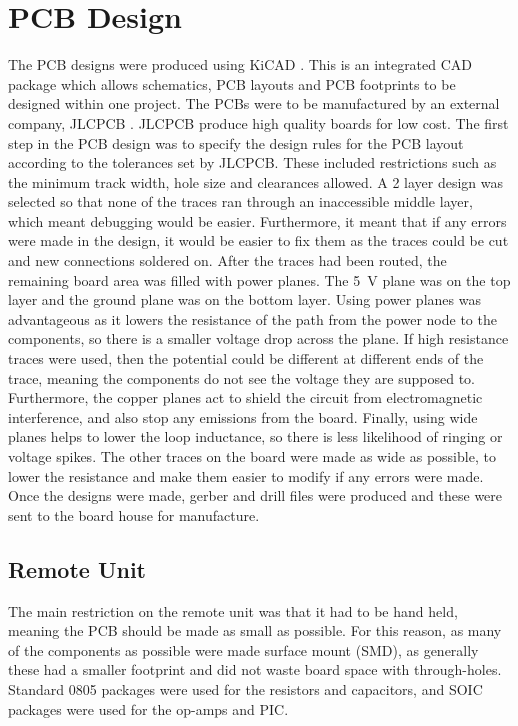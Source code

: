 \section{PCB Design}
The PCB designs were produced using KiCAD \cite{kicad}. This is an integrated CAD package which allows schematics, PCB layouts and PCB footprints to be designed within one project. The PCBs were to be manufactured by an external company, JLCPCB \cite{pcb_house}. JLCPCB produce high quality boards for low cost. The first step in the PCB design was to specify the design rules for the PCB layout according to the tolerances set by JLCPCB. These included restrictions such as the minimum track width, hole size and clearances allowed. A 2 layer design was selected so that none of the traces ran through an inaccessible middle layer, which meant debugging would be easier. Furthermore, it meant that if any errors were made in the design, it would be easier to fix them as the traces could be cut and new connections soldered on. After the traces had been routed, the remaining board area was filled with power planes. The \SI{+5}{\volt} plane was on the top layer and the ground plane was on the bottom layer. Using power planes was advantageous as it lowers the resistance of the path from the power node to the components, so there is a smaller voltage drop across the plane. If high resistance traces were used, then the potential could be different at different ends of the trace, meaning the components do not see the voltage they are supposed to. Furthermore, the copper planes act to shield the circuit from electromagnetic interference, and also stop any emissions from the board. Finally, using wide planes helps to lower the loop inductance, so there is less likelihood of ringing or voltage spikes. The other traces on the board were made as wide as possible, to lower the resistance and make them easier to modify if any errors were made. Once the designs were made, gerber and drill files were produced and these were sent to the board house for manufacture.\\


\subsection{Remote Unit}
The main restriction on the remote unit was that it had to be hand held, meaning the PCB should be made as small as possible. For this reason, as many of the components as possible were made surface mount (SMD), as generally these had a smaller footprint and did not waste board space with through-holes. Standard 0805 packages were used for the resistors and capacitors, and SOIC packages were used for the op-amps and PIC.\\

